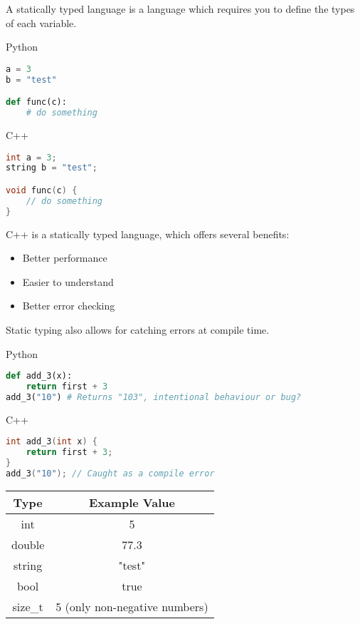 \documentclass[]{article}
\begin{document}
\begin{definition}
    A statically typed language is a language which requires you to define the types of each variable.
\end{definition}

\begin{minipage}{0.45\linewidth}
    Python
    \begin{lstlisting}[language=Python, numbers=none]
a = 3
b = "test"

def func(c):
    # do something
    \end{lstlisting}
\end{minipage}
\begin{minipage}{0.45\linewidth}
    C++
    \begin{lstlisting}[language=C++, numbers=none]
int a = 3;
string b = "test";

void func(c) {
    // do something
}
    \end{lstlisting}
\end{minipage}

C++ is a statically typed language, which offers several benefits:
\begin{itemize}
    \item Better performance
    \item Easier to understand
    \item Better error checking
\end{itemize}

Static typing also allows for catching errors at compile time.

\begin{minipage}{0.45\linewidth}
    Python
    \begin{lstlisting}[language=Python, numbers=none]
def add_3(x):
    return first + 3
add_3("10") # Returns "103", intentional behaviour or bug?
    \end{lstlisting}
\end{minipage}
\begin{minipage}{0.45\linewidth}
    C++
    \begin{lstlisting}[language=C++, numbers=none]
int add_3(int x) {
    return first + 3;
}
add_3("10"); // Caught as a compile error
    \end{lstlisting}
\end{minipage}

\begin{center}
\begin{tabular}{c c}
    Type & Example Value \\
    \hline
    int & 5 \\
    double & 77.3 \\
    string & "test" \\
    bool & true \\
    size\_t & 5 (only non-negative numbers)

\end{tabular}
\end{center}
\end{document}
